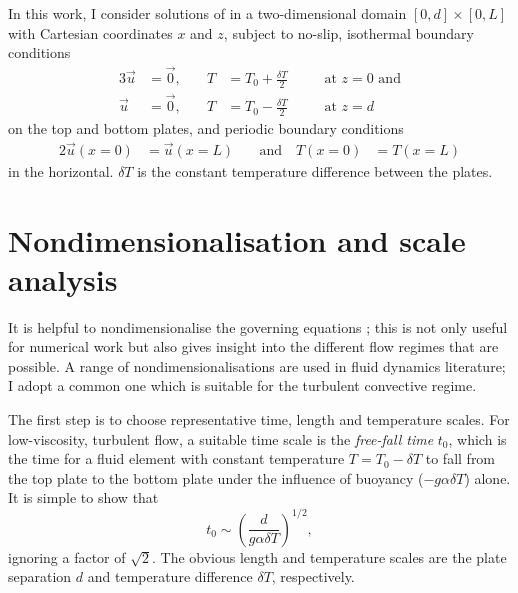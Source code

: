 \documentclass[../main.tex]{subfiles}
\begin{document}
In this work, I consider solutions of
 in a two-dimensional
domain $[0, d] \times [0, L]$ with Cartesian coordinates $x$ and $z$, subject
to no-slip, isothermal boundary conditions
\begin{alignat}{3}
    \label{eqn:dim_bc_bot}
    \vec{u} &= \vec{0}, &\quad T &= T_0 + \frac{\delta T}{2} &\quad& \text{at
    } z = 0 \text{ and} \\
    \label{eqn:dim_bc_top}
    \vec{u} &= \vec{0}, &\quad T &= T_0 - \frac{\delta T}{2} &\quad& \text{at
    } z = d
\end{alignat}
on the top and bottom plates, and periodic boundary conditions
\begin{alignat}{2}
    \label{eqn:dim_bc_sides}
    \vec{u}(x=0) &= \vec{u}(x=L) &\quad \text{and} \quad T(x=0) &= T(x=L)
\end{alignat}
in the horizontal. $\delta T$ is the constant temperature difference between
the plates.

\section{Nondimensionalisation and scale analysis}
It is helpful to nondimensionalise the governing equations
; this is not only useful for
numerical work but also gives insight into the different flow regimes that are
possible. A range of nondimensionalisations are used in fluid dynamics
literature; I adopt a common one \parencite[see,
e.g.,][]{grotzbach1983,ouertatani2008,stevens2010} which is suitable for the
turbulent convective regime.

The first step is to choose representative time, length and temperature scales.
For low-viscosity, turbulent flow, a suitable time scale is the \emph{free-fall
time} $t_0$, which is the time for a fluid element with constant temperature $T
= T_0 - \delta T$ to fall from the top plate to the bottom plate under the
influence of buoyancy ($-g \alpha \delta T$) alone. It is simple to show that
\[
    t_0 \sim \left( \frac{d}{g \alpha \delta T} \right)^{1/2},
\]
ignoring a factor of $\sqrt{2}$. The obvious length and temperature scales are
the plate separation $d$ and temperature difference $\delta T$, respectively.
\end{document}
